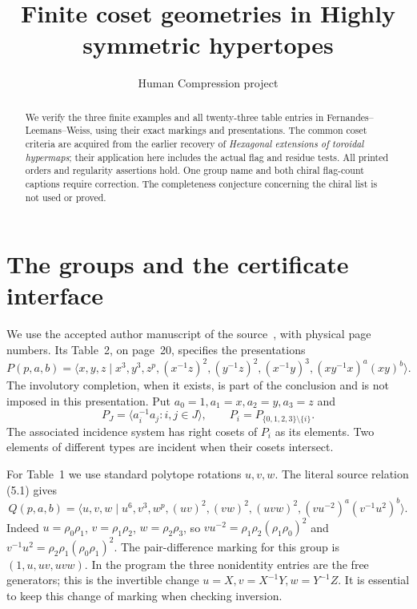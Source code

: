 \documentclass[11pt,a4paper]{article}
\title{Finite coset geometries in Highly symmetric hypertopes}
\author{Human Compression project}\date{}
\newcommand{\gen}[1]{\langle #1\rangle}\newcommand{\Aut}{\operatorname{Aut}}
\begin{document}
\maketitle
\begin{abstract}
We verify the three finite examples and all twenty-three table entries in
Fernandes--Leemans--Weiss, using their exact markings and presentations.
The common coset criteria are acquired from the earlier recovery of
\emph{Hexagonal extensions of toroidal hypermaps}; their application here
includes the actual flag and residue tests. All printed orders and
regularity assertions hold. One group name and both chiral flag-count
captions require correction. The completeness conjecture concerning the
chiral list is not used or proved.
\end{abstract}

\section{The groups and the certificate interface}
We use the accepted author manuscript of the source~\cite{source}, with
physical page numbers. Its Table~2, on page~20, specifies the presentations
\begin{equation}\label{hyp}
 P(p,a,b)=\gen{x,y,z\mid x^3,y^3,z^p,(x^{-1}z)^2,
 (y^{-1}z)^2,(x^{-1}y)^3,(xy^{-1}x)^a(xy)^b}.
\end{equation}
The involutory completion, when it exists, is part of the conclusion and
is not imposed in this presentation. Put $a_0=1,a_1=x,a_2=y,a_3=z$ and
\[
 P_J=\gen{a_i^{-1}a_j:i,j\in J},\qquad P_i=P_{\{0,1,2,3\}\setminus\{i\}}.
\]
The associated incidence system has right cosets of $P_i$ as its elements.
Two elements of different types are incident when their cosets intersect.

For Table~1 we use standard polytope rotations $u,v,w$. The literal
source relation (5.1) gives
\begin{equation}\label{poly}
 Q(p,a,b)=\gen{u,v,w\mid u^6,v^3,w^p,(uv)^2,(vw)^2,
 (uvw)^2,(vu^{-2})^a(v^{-1}u^2)^b}.
\end{equation}
Indeed $u=\rho_0\rho_1$, $v=\rho_1\rho_2$, $w=\rho_2\rho_3$, so
$vu^{-2}=\rho_1\rho_2(\rho_1\rho_0)^2$ and
$v^{-1}u^2=\rho_2\rho_1(\rho_0\rho_1)^2$.
The pair-difference marking for this group is
$(1,u,uv,uvw)$. In the program the three nonidentity entries are the free
generators; this is the invertible change $u=X,v=X^{-1}Y,w=Y^{-1}Z$.
It is essential to keep this change of marking when checking inversion.
\end{document}
